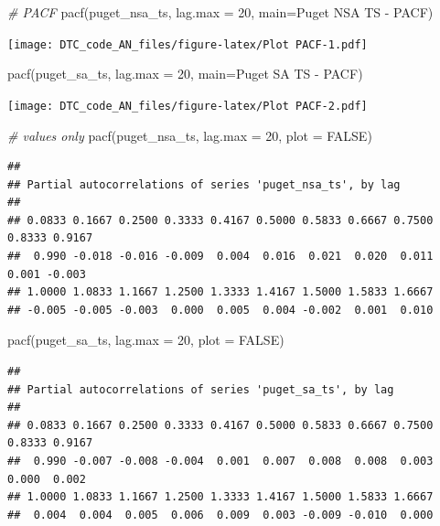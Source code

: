 \documentclass[
]{article}
\newenvironment{Shaded}{\begin{snugshade}}{\end{snugshade}}
\newcommand{\AttributeTok}[1]{\textcolor[rgb]{0.77,0.63,0.00}{#1}}
\newcommand{\CommentTok}[1]{\textcolor[rgb]{0.56,0.35,0.01}{\textit{#1}}}
\newcommand{\ConstantTok}[1]{\textcolor[rgb]{0.00,0.00,0.00}{#1}}
\newcommand{\DecValTok}[1]{\textcolor[rgb]{0.00,0.00,0.81}{#1}}
\newcommand{\FunctionTok}[1]{\textcolor[rgb]{0.00,0.00,0.00}{#1}}
\newcommand{\NormalTok}[1]{#1}
\newcommand{\StringTok}[1]{\textcolor[rgb]{0.31,0.60,0.02}{#1}}
\begin{document}
\begin{Shaded}
\begin{Highlighting}[]
\CommentTok{\# PACF}
\FunctionTok{pacf}\NormalTok{(puget\_nsa\_ts, }\AttributeTok{lag.max =} \DecValTok{20}\NormalTok{, }\AttributeTok{main=}\StringTok{\textquotesingle{}Puget NSA TS {-} PACF\textquotesingle{}}\NormalTok{)}
\end{Highlighting}
\end{Shaded}

\texttt{[image: DTC\_code\_AN\_files/figure-latex/Plot PACF-1.pdf]}

\begin{Shaded}
\begin{Highlighting}[]
\FunctionTok{pacf}\NormalTok{(puget\_sa\_ts, }\AttributeTok{lag.max =} \DecValTok{20}\NormalTok{, }\AttributeTok{main=}\StringTok{\textquotesingle{}Puget SA TS {-} PACF\textquotesingle{}}\NormalTok{)}
\end{Highlighting}
\end{Shaded}

\texttt{[image: DTC\_code\_AN\_files/figure-latex/Plot PACF-2.pdf]}

\begin{Shaded}
\begin{Highlighting}[]
\CommentTok{\# values only}
\FunctionTok{pacf}\NormalTok{(puget\_nsa\_ts, }\AttributeTok{lag.max =} \DecValTok{20}\NormalTok{, }\AttributeTok{plot =} \ConstantTok{FALSE}\NormalTok{)}
\end{Highlighting}
\end{Shaded}

\begin{verbatim}
## 
## Partial autocorrelations of series 'puget_nsa_ts', by lag
## 
## 0.0833 0.1667 0.2500 0.3333 0.4167 0.5000 0.5833 0.6667 0.7500 0.8333 0.9167 
##  0.990 -0.018 -0.016 -0.009  0.004  0.016  0.021  0.020  0.011  0.001 -0.003 
## 1.0000 1.0833 1.1667 1.2500 1.3333 1.4167 1.5000 1.5833 1.6667 
## -0.005 -0.005 -0.003  0.000  0.005  0.004 -0.002  0.001  0.010
\end{verbatim}

\begin{Shaded}
\begin{Highlighting}[]
\FunctionTok{pacf}\NormalTok{(puget\_sa\_ts, }\AttributeTok{lag.max =} \DecValTok{20}\NormalTok{, }\AttributeTok{plot =} \ConstantTok{FALSE}\NormalTok{)}
\end{Highlighting}
\end{Shaded}

\begin{verbatim}
## 
## Partial autocorrelations of series 'puget_sa_ts', by lag
## 
## 0.0833 0.1667 0.2500 0.3333 0.4167 0.5000 0.5833 0.6667 0.7500 0.8333 0.9167 
##  0.990 -0.007 -0.008 -0.004  0.001  0.007  0.008  0.008  0.003  0.000  0.002 
## 1.0000 1.0833 1.1667 1.2500 1.3333 1.4167 1.5000 1.5833 1.6667 
##  0.004  0.004  0.005  0.006  0.009  0.003 -0.009 -0.010  0.000
\end{verbatim}
\end{document}
